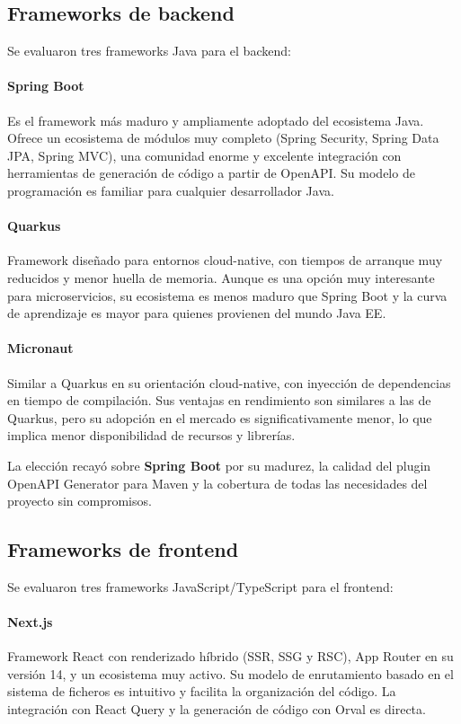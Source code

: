 \subsection{Frameworks de backend}

Se evaluaron tres frameworks Java para el backend:

\paragraph{Spring Boot~\cite{springboot}} Es el framework más maduro y ampliamente adoptado del
ecosistema Java. Ofrece un ecosistema de módulos muy completo (Spring Security,
Spring Data JPA, Spring MVC), una comunidad enorme y excelente integración con
herramientas de generación de código a partir de OpenAPI. Su modelo de
programación es familiar para cualquier desarrollador Java.

\paragraph{Quarkus} Framework diseñado para entornos cloud-native, con tiempos
de arranque muy reducidos y menor huella de memoria. Aunque es una opción muy
interesante para microservicios, su ecosistema es menos maduro que Spring Boot
y la curva de aprendizaje es mayor para quienes provienen del mundo Java EE.

\paragraph{Micronaut} Similar a Quarkus en su orientación cloud-native, con
inyección de dependencias en tiempo de compilación. Sus ventajas en rendimiento
son similares a las de Quarkus, pero su adopción en el mercado es significativamente
menor, lo que implica menor disponibilidad de recursos y librerías.

La elección recayó sobre \textbf{Spring Boot} por su madurez, la calidad del
plugin OpenAPI Generator para Maven y la cobertura de todas las necesidades
del proyecto sin compromisos.

\subsection{Frameworks de frontend}

Se evaluaron tres frameworks JavaScript/TypeScript para el frontend:

\paragraph{Next.js~\cite{nextjs}} Framework React con renderizado híbrido (SSR, SSG y RSC),
App Router en su versión 14, y un ecosistema muy activo. Su modelo de enrutamiento
basado en el sistema de ficheros es intuitivo y facilita la organización del
código. La integración con React Query y la generación de código con Orval es
directa.

